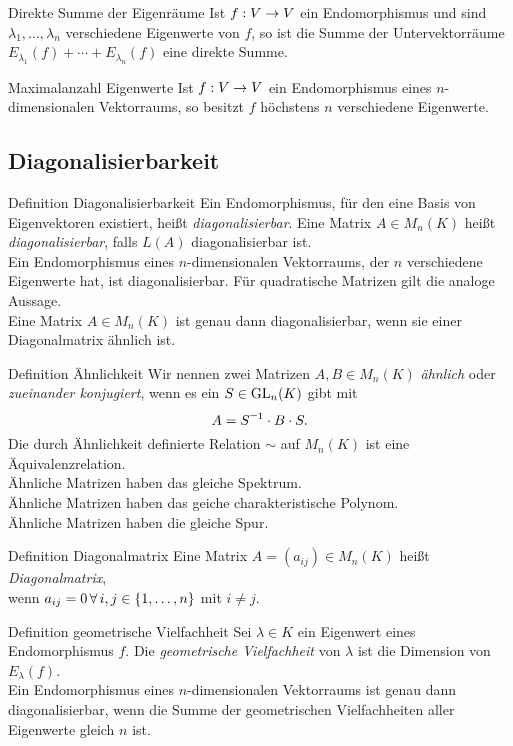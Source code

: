 \documentclass[main.tex]{subfiles}
\begin{document}
\begin{karte}{Direkte Summe der Eigenräume}
    Ist \( f : V \rightarrow V \) ein Endomorphismus und sind 
    \( \lambda_1,\ldots,\lambda_n \) verschiedene Eigenwerte 
    von \(f\), so ist die Summe der Untervektorräume 
    \( E_{\lambda_1}(f) + \cdots + E_{\lambda_n}(f) \) eine 
    direkte Summe.
\end{karte}
\begin{karte}{Maximalanzahl Eigenwerte}
    Ist \( f : V \rightarrow V \) ein Endomorphismus eines 
    \(n\)-dimensionalen Vektorraums, so besitzt \(f\) 
    höchstens \(n\) verschiedene Eigenwerte.
\end{karte}
\subsection*{Diagonalisierbarkeit}
\begin{karte}{Definition Diagonalisierbarkeit}
    Ein Endomorphismus, für den eine Basis von Eigenvektoren 
    existiert, heißt \textit{diagonalisierbar}. Eine Matrix 
    \( A \in M_n(K) \) heißt \textit{diagonalisierbar}, falls 
    \( L(A) \) diagonalisierbar ist.\\
    Ein Endomorphismus eines \(n\)-dimensionalen Vektorraums, 
    der \(n\) verschiedene Eigenwerte hat, ist diagonalisierbar. 
    Für quadratische Matrizen gilt die analoge Aussage.\\
    Eine Matrix \( A \in M_n(K) \) ist genau dann diagonalisierbar, 
    wenn sie einer Diagonalmatrix ähnlich ist.
\end{karte}
\begin{karte}{Definition Ähnlichkeit}
    Wir nennen zwei Matrizen \( A, B \in M_n(K) \) 
    \textit{ähnlich} oder \textit{zueinander konjugiert}, 
    wenn es ein \( S \in \operatorname{GL}_n(K) \) gibt mit 
    \[ A = \inverse{S} \cdot B \cdot S. \]
    Die durch Ähnlichkeit definierte Relation \( \sim \) 
    auf \( M_n(K) \) ist eine Äquivalenzrelation.\\
    Ähnliche Matrizen haben das gleiche Spektrum.\\
    Ähnliche Matrizen haben das geiche charakteristische Polynom.\\
    Ähnliche Matrizen haben die gleiche Spur.
\end{karte}
\begin{karte}{Definition Diagonalmatrix}
    Eine Matrix \( A = (a_{ij}) \in M_n(K) \) heißt 
    \textit{Diagonalmatrix}, \\
    wenn \( a_{ij} = 0 
    \, \forall i,j \in \set{1,\ldots,n} \) mit \( i \neq j \).\\
\end{karte}
\begin{karte}{Definition geometrische Vielfachheit}
    Sei \( \lambda \in K \) ein Eigenwert eines Endomorphismus 
    \( f \). Die \textit{geometrische Vielfachheit} von 
    \( \lambda \) ist die Dimension von \( E_\lambda(f) \).\\
    Ein Endomorphismus eines \(n\)-dimensionalen Vektorraums 
    ist genau dann diagonalisierbar, wenn die Summe der 
    geometrischen Vielfachheiten aller Eigenwerte gleich 
    \(n\) ist.
\end{karte}
\end{document}
